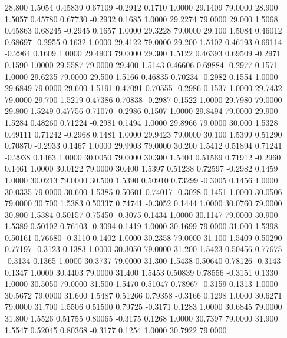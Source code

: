   28.800   1.5054   0.45839   0.67109  -0.2912   0.1710   1.0000  29.1409  79.0000
  28.900   1.5057   0.45780   0.67730  -0.2932   0.1685   1.0000  29.2274  79.0000
  29.000   1.5068   0.45863   0.68245  -0.2945   0.1657   1.0000  29.3228  79.0000
  29.100   1.5084   0.46012   0.68697  -0.2955   0.1632   1.0000  29.4122  79.0000
  29.200   1.5102   0.46193   0.69114  -0.2964   0.1609   1.0000  29.4903  79.0000
  29.300   1.5122   0.46393   0.69509  -0.2971   0.1590   1.0000  29.5587  79.0000
  29.400   1.5143   0.46606   0.69884  -0.2977   0.1571   1.0000  29.6235  79.0000
  29.500   1.5166   0.46835   0.70234  -0.2982   0.1554   1.0000  29.6849  79.0000
  29.600   1.5191   0.47091   0.70555  -0.2986   0.1537   1.0000  29.7432  79.0000
  29.700   1.5219   0.47386   0.70838  -0.2987   0.1522   1.0000  29.7980  79.0000
  29.800   1.5249   0.47756   0.71070  -0.2986   0.1507   1.0000  29.8494  79.0000
  29.900   1.5284   0.48260   0.71224  -0.2981   0.1494   1.0000  29.8966  79.0000
  30.000   1.5328   0.49111   0.71242  -0.2968   0.1481   1.0000  29.9423  79.0000
  30.100   1.5399   0.51290   0.70870  -0.2933   0.1467   1.0000  29.9903  79.0000
  30.200   1.5412   0.51894   0.71241  -0.2938   0.1463   1.0000  30.0050  79.0000
  30.300   1.5404   0.51569   0.71912  -0.2960   0.1461   1.0000  30.0122  79.0000
  30.400   1.5397   0.51238   0.72597  -0.2982   0.1459   1.0000  30.0213  79.0000
  30.500   1.5390   0.50910   0.73299  -0.3005   0.1456   1.0000  30.0335  79.0000
  30.600   1.5385   0.50601   0.74017  -0.3028   0.1451   1.0000  30.0506  79.0000
  30.700   1.5383   0.50337   0.74741  -0.3052   0.1444   1.0000  30.0760  79.0000
  30.800   1.5384   0.50157   0.75450  -0.3075   0.1434   1.0000  30.1147  79.0000
  30.900   1.5389   0.50102   0.76103  -0.3094   0.1419   1.0000  30.1699  79.0000
  31.000   1.5398   0.50161   0.76680  -0.3110   0.1402   1.0000  30.2358  79.0000
  31.100   1.5409   0.50290   0.77197  -0.3123   0.1383   1.0000  30.3050  79.0000
  31.200   1.5423   0.50456   0.77675  -0.3134   0.1365   1.0000  30.3737  79.0000
  31.300   1.5438   0.50640   0.78126  -0.3143   0.1347   1.0000  30.4403  79.0000
  31.400   1.5453   0.50839   0.78556  -0.3151   0.1330   1.0000  30.5050  79.0000
  31.500   1.5470   0.51047   0.78967  -0.3159   0.1313   1.0000  30.5672  79.0000
  31.600   1.5487   0.51266   0.79358  -0.3166   0.1298   1.0000  30.6271  79.0000
  31.700   1.5506   0.51500   0.79725  -0.3171   0.1283   1.0000  30.6845  79.0000
  31.800   1.5526   0.51755   0.80065  -0.3175   0.1268   1.0000  30.7397  79.0000
  31.900   1.5547   0.52045   0.80368  -0.3177   0.1254   1.0000  30.7922  79.0000
